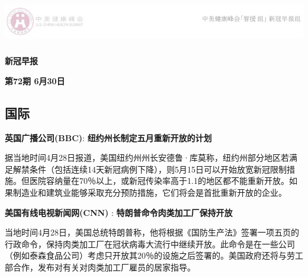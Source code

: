 \documentclass[
]{article}
\author{}
\date{\vspace{-2.5em}}
\begin{document}
\fontsize{22}{22}
\selectfont
\vspace{-10truemm}

\newcommand{\resheading}[1]{%
  \noindent\fcolorbox{lavenderblush}{lavenderblush}{\makebox[\dimexpr\textwidth-2\fboxsep-2\fboxrule][c]{\textbf{~#1}}}%
}

\begin{center}
\includegraphics[height=2cm]{./input/logo2.png} 
\end{center}

\begin{center}
\fontsize{45}{45}
\textcolor{glaucous}{\textbf{新冠早报}}
\end{center}

\begin{center}
\fontsize{22}{22}
{\textcolor{glaucous}{\textbf{第72期 \space 6月30日}}}
\end{center}

%
  \noindent{}%

\vspace{-5mm}

\hypertarget{section}{%
\subsection{\texorpdfstring{\textcolor{glaucous}{\Huge 国际}}{}}\label{section}}

\vspace{-3mm}

\textbf{\textcolor{glaucous}{英国广播公司(BBC)}}:
\textbf{纽约州长制定五月重新开放的计划 }

据当地时间4月28日报道，美国纽约州州长安德鲁·库莫称，纽约州部分地区若满足解禁条件（包括连续14天新冠病例下降），则5月15日可以开始放宽新冠限制措施。但医院容纳量在70％以上，或新冠传染率高于1.1的地区都不能重新开放。如果制造业和建筑业能够采取充分预防措施，它们将会是首批重新开放的企业。

\textbf{\textcolor{glaucous}{美国有线电视新闻网(CNN)}} :
\textbf{特朗普命令肉类加工厂保持开放}

当地时间4月28日，美国总统特朗普称，他将根据《国防生产法》签署一项五页的行政命令，保持肉类加工厂在冠状病毒大流行中继续开放。此命令是在一些公司（例如泰森食品公司）考虑只开放其20％的设施之后签署的。美国政府还将与劳工部合作，发布对有关对肉类加工厂雇员的居家指导。
\end{document}
